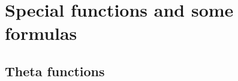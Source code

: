 \begin{comment}
\documentclass[11pt]{article}  %
\usepackage{Common/toshi}

\end{comment}




\section{Special functions and some formulas}
\label{sec:special_functions}




\subsection{Theta functions}

